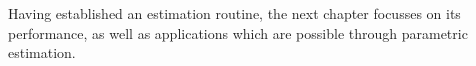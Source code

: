 
Having established an estimation routine, the next chapter focusses on its
performance, as well as applications which are possible through parametric
estimation.
